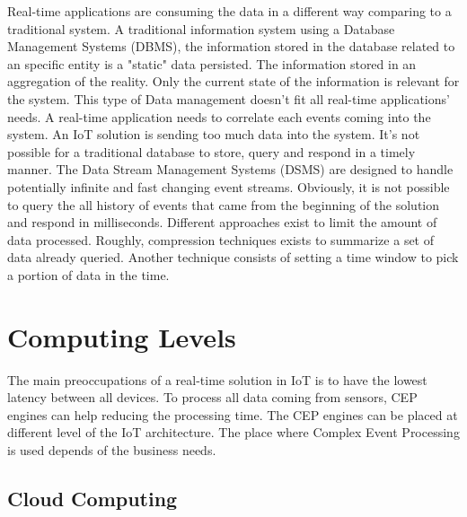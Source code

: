 \documentclass[11pt]{article}
\begin{document}
Real-time applications are consuming the data in a different way comparing to a traditional system. A traditional information system using a Database Management Systems (DBMS), the information stored in the database related to an specific entity is a "static" data persisted. The information stored in an aggregation of the reality. Only the current state of the information is relevant for the system. This type of Data management doesn't fit all real-time applications' needs. A real-time application needs to correlate each events coming into the system. An IoT solution is sending too much data into the system. It's not possible for a traditional database to store, query and respond in a timely manner. 
\newline
\newline
The Data Stream Management Systems (DSMS) are designed to handle potentially infinite and fast changing event streams. Obviously, it is not possible to query the all history of events that came from the beginning of the solution and respond in milliseconds. Different approaches exist to limit the amount of data processed. Roughly, compression techniques exists to summarize a set of data already queried. Another technique consists of setting a time window to pick a portion of data in the time. 


\section{Computing Levels}

The main preoccupations of a real-time solution in IoT is to have the lowest latency between all devices. To process all data coming from sensors, CEP engines can help reducing the processing time. The CEP engines can be placed at different level of the IoT architecture. The place where Complex Event Processing is used depends of the business needs. 


\subsection{Cloud Computing}
\end{document}
